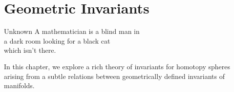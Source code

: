 \chapter{Geometric Invariants}\label{chap:invariants}

\begin{epigraph}{15em}{Unknown}
	A mathematician is a blind man in \\
	a dark room looking for a black cat \\
	which isn’t there.
\end{epigraph}

In this chapter, we explore a rich theory of invariants for homotopy spheres arising from a subtle relations between geometrically defined invariants of manifolds.




